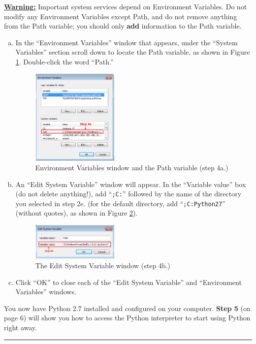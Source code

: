 \documentclass[11pt,english]{article}
\newcommand{\myhrule}{\vspace{0.3cm}\hrule\vspace{0.3cm}}
\begin{document}
{\bf \color{red} \underline{Warning:}} Important system services depend on
Environment Variables. Do not modify any Environment Variables
except Path, and do not remove anything from the Path variable; you should only
{\bf add} information to the Path variable.

\begin{enumerate}[a.]
\item In the ``Environment Variables'' window that appears, under the ``System
Variables'' section scroll down to locate the Path variable, as shown in Figure
\ref{fig:dia7}. Double-click the word ``Path.''
\begin{figure}[h]
\begin{center}
\includegraphics[width=0.4\textwidth]{dia7}
\end{center}
\vspace{-0.5cm}
\caption{Environment Variables window and the Path variable (step 4a.)}
\label{fig:dia7}
\end{figure}
\item An ``Edit System Variable'' window will appear. In the ``Variable value''
box (do not delete anything!), add ``\texttt{;C:}'' followed by the name of the
directory you selected in step 2e. (for the default directory, add
``\texttt{;C:Python27}'' (without quotes), as shown in Figure \ref{fig:dia8}).
\begin{figure}[h]
\begin{center}
\includegraphics[width=0.4\textwidth]{dia8}
\end{center}
\vspace{-0.5cm}
\caption{The Edit System Variable window (step 4b.)}
\label{fig:dia8}
\end{figure}
\item Click ``OK'' to close each of the ``Edit System Variable'' and
``Environment Variables'' windows.
\end{enumerate}
\vfill
You now have Python 2.7 installed and configured on your computer. {\bf Step 5}
(on page 6) will show you how to access the Python interpreter to start using
Python right away.
\myhrule
\end{document}
